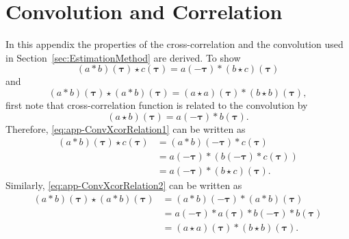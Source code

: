 \documentclass[10pt,twocolumn,twoside]{IEEEtran}
\begin{document}
 \section*{Convolution and Correlation}\label{ap:CorrelationAnalysis}
In this appendix the properties of the cross-correlation and the convolution used in Section~\ref{sec:EstimationMethod}   are derived. To show 
\begin{equation}\label{eq:app-ConvXcorRelation1}
 \left(a \ast b \right)\left(\boldsymbol\tau\right)  \star c\left(\boldsymbol\tau\right)  = a\left(-\boldsymbol\tau\right)\ast\left(b \star c\right)\left(\boldsymbol\tau\right)
\end{equation}
and
\begin{equation}\label{eq:app-ConvXcorRelation2}
(a \ast b)(\boldsymbol \tau) \star (a \ast b)(\boldsymbol\tau)=(a \star a)(\boldsymbol\tau)\ast(b \star b)(\boldsymbol\tau),
\end{equation}
first note that cross-correlation function is related to the convolution by \cite{Yarlagadda2009}
\begin{equation}\label{eq:app-ConvXcorRelation}
 \left(a \star b\right)\left(\boldsymbol\tau\right)= a\left(-\boldsymbol\tau\right)\ast b\left(\boldsymbol\tau\right).
\end{equation}
Therefore, \eqref{eq:app-ConvXcorRelation1} can be written as
\begin{align}
 \left(a \ast b\right)\left(\boldsymbol\tau\right) \star c\left(\boldsymbol\tau\right)&= \left(a \ast b\right)\left(-\boldsymbol\tau \right)\ast c\left(\boldsymbol\tau\right) \nonumber \\
&=a\left(-\boldsymbol\tau\right)\ast \left(b\left(-\boldsymbol\tau\right) \ast c\left(\boldsymbol\tau\right)\right)\nonumber \\
&=a\left(-\boldsymbol\tau\right)\ast\left(b\star c\right)\left(\boldsymbol\tau\right).
\end{align}
Similarly, \eqref{eq:app-ConvXcorRelation2} can be written as
\begin{align}
 (a \ast b)(\boldsymbol \tau) \star (a \ast b)(\boldsymbol\tau)&=(a \ast b)(-\boldsymbol\tau) \ast (a \ast b)(\boldsymbol\tau) \nonumber \\
&=a(-\boldsymbol\tau)\ast a(\boldsymbol\tau) \ast b(-\boldsymbol\tau)\ast b(\boldsymbol\tau) \nonumber \\
&=(a \star a)(\boldsymbol\tau)\ast(b \star b)(\boldsymbol\tau).
\end{align}     
                
\end{document}
